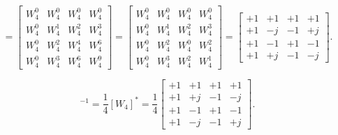 \begin{equation*}
[W_4] =
\begin{bmatrix}
W^0_4 & W^0_4 & W^0_4 & W^0_4\\
W^0_4 & W^1_4 & W^2_4 & W^3_4\\
W^0_4 & W^2_4 & W^4_4 & W^6_4\\
W^0_4 & W^3_4 & W^6_4 & W^9_4
\end{bmatrix} =
\begin{bmatrix}
W^0_4 & W^0_4 & W^0_4 & W^0_4\\
W^0_4 & W^1_4 & W^2_4 & W^3_4\\
W^0_4 & W^2_4 & W^0_4 & W^2_4\\
W^0_4 & W^3_4 & W^2_4 & W^1_4
\end{bmatrix} =
\begin{bmatrix}
+1 & +1 & +1 & +1\\
+1 & -j & -1 & +j\\
+1 & -1 & +1 & -1\\
+1 & +j & -1 & -j
\end{bmatrix}.
\end{equation*}

\begin{equation*}
[W_4]^{-1} = \dfrac{1}{4}[W_4]^{*} = \dfrac{1}{4}
\begin{bmatrix}
+1 & +1 & +1 & +1\\
+1 & +j & -1 & -j\\
+1 & -1 & +1 & -1\\
+1 & -j & -1 & +j
\end{bmatrix}.
\end{equation*}
